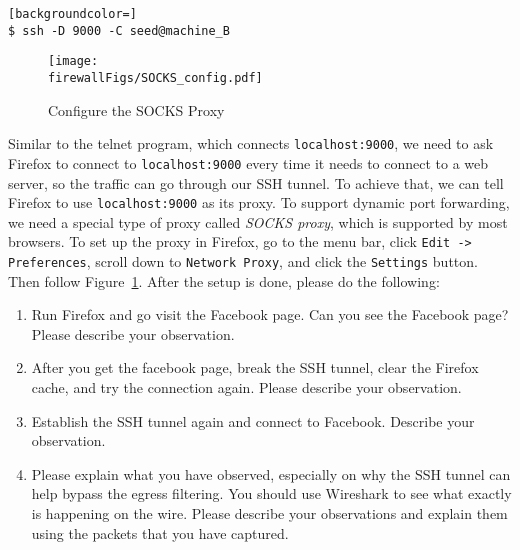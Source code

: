 \begin{lstlisting}[backgroundcolor=]
$ ssh -D 9000 -C seed@machine_B
\end{lstlisting}


\begin{figure}[htb]
  \begin{center}
     \texttt{[image: \\firewallFigs/SOCKS\_config.pdf]}
  \end{center}
  \caption{Configure the SOCKS Proxy}
  \label{firewall:fig:socks_config}
\end{figure}



Similar to the telnet program, which connects {\tt localhost:9000}, 
we need to ask Firefox to connect to {\tt localhost:9000} every time it 
needs to connect to a web server, so the traffic can 
go through our SSH tunnel. To achieve that, we can tell Firefox to
use {\tt localhost:9000} as its proxy. 
To support dynamic port forwarding, we need a special type of proxy 
called \textit{SOCKS proxy}, which is supported by most browsers. 
To set up the proxy in Firefox, go to the menu bar, 
click \texttt{Edit -> Preferences}, 
scroll down to \texttt{Network Proxy},  and
click the \texttt{Settings} button.
Then follow Figure~\ref{firewall:fig:socks_config}.
After the setup is done, please do the following:


\begin{enumerate}
\item Run Firefox and go visit the Facebook page.
Can you see the Facebook page? 
Please describe your observation. 

\item After you get the facebook page, break the SSH tunnel, 
clear the Firefox cache, and try the connection again. 
Please describe your observation. 

\item Establish the SSH tunnel again and connect to Facebook. 
Describe your observation. 

\item Please explain what you have observed, especially
on why the SSH tunnel can help bypass the egress filtering. 
You should use Wireshark to see
what exactly is happening on the wire. Please describe your 
observations and explain them using the packets that you
have captured.
\end{enumerate}


